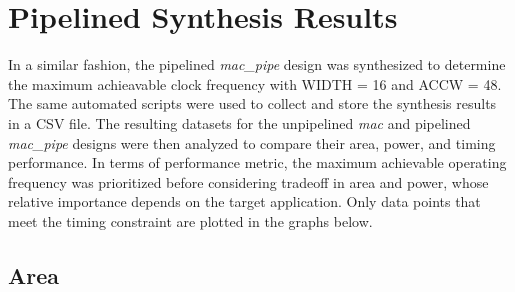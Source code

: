 \documentclass[a4paper,11pt]{article}
\begin{document}
\section{Pipelined Synthesis Results}

In a similar fashion, the pipelined \textit{mac\_pipe} design was synthesized to determine the maximum achieavable clock frequency with WIDTH = 16 and ACCW = 48. The same automated scripts were used to collect and store the synthesis results in a CSV file. The resulting datasets for the unpipelined \textit{mac} and pipelined \textit{mac\_pipe} designs were then analyzed to compare their area, power, and timing performance. In terms of performance metric, the maximum achievable operating frequency was prioritized before considering tradeoff in area and power, whose relative importance depends on the target application. Only data points
that meet the timing constraint are plotted in the graphs below.





\subsection{Area}
\end{document}
